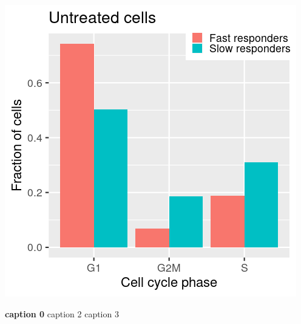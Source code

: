 \begin{suppfigure}[p]  
    \centering
    \includegraphics[width=\linewidth]{figures/hedgehog/SuppFigure8.png}
    \caption[caption1]{
        \textbf{caption 0}
        caption 2
        caption 3   
    }
    \label{fig:hh_figureS8}
\end{suppfigure}


